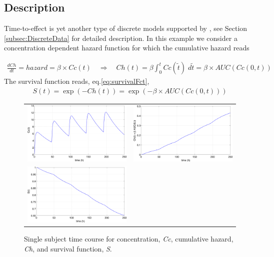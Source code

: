 \subsection{Description}
\label{subsec:exp8_intro} 
Time-to-effect is yet another type of discrete models supported by \pml, see Section 
\ref{subsec:DiscreteData} for detailed description.
In this example we consider a concentration dependent hazard function for which 
the cumulative hazard reads

\begin{eqnarray}
\frac{dCh}{dt} = hazard = \beta \times Cc(t) \quad \Longrightarrow \quad Ch(t) = \beta \int_0^{t} Cc(\tilde{t}) \;d\tilde{t} = \beta \times AUC(Cc(0,t))  \label{eq:hazardODE1}
\end{eqnarray}
The survival function reads, eq.\eqref{eq:survivalFct},
\begin{eqnarray}
S(t) = \exp(-Ch(t)) = \exp(- \beta \times AUC(Cc(0,t))) \label{eq:survivalFct}
\end{eqnarray}

\begin{figure}[htb!]
\centering
\begin{tabular}{cc}
 \includegraphics[width=70mm]{pics/example8_singleCc} & 
 \includegraphics[width=70mm]{pics/example8_singleCh} \\
 \includegraphics[width=70mm]{pics/example8_singleS} &
\end{tabular}
\caption{Single subject time course for concentration, \emph{Cc}, cumulative hazard, \emph{Ch}, 
and survival function, \emph{S}.}
\end{figure}


